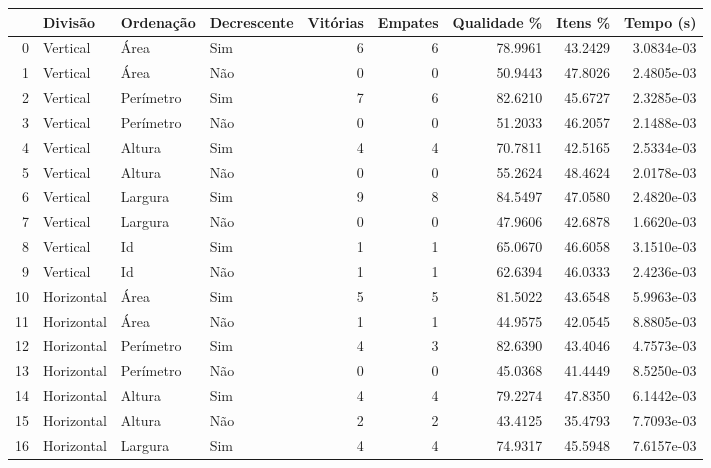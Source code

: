 \begin{tabular}{rlllrrrrr}
\hline
& Divisão     & Ordenação & Decrescente & Vitórias & Empates & Qualidade \% & Itens \% & Tempo (s)  \\
\hline
0  & Vertical    & Área      & Sim         & 6        & 6       & 78.9961      & 43.2429  & 3.0834e-03 \\
1  & Vertical    & Área      & Não         & 0        & 0       & 50.9443      & 47.8026  & 2.4805e-03 \\
2  & Vertical    & Perímetro & Sim         & 7        & 6       & 82.6210      & 45.6727  & 2.3285e-03 \\
3  & Vertical    & Perímetro & Não         & 0        & 0       & 51.2033      & 46.2057  & 2.1488e-03 \\
4  & Vertical    & Altura    & Sim         & 4        & 4       & 70.7811      & 42.5165  & 2.5334e-03 \\
5  & Vertical    & Altura    & Não         & 0        & 0       & 55.2624      & 48.4624  & 2.0178e-03 \\
6  & Vertical    & Largura   & Sim         & 9        & 8       & 84.5497      & 47.0580  & 2.4820e-03 \\
7  & Vertical    & Largura   & Não         & 0        & 0       & 47.9606      & 42.6878  & 1.6620e-03 \\
8  & Vertical    & Id        & Sim         & 1        & 1       & 65.0670      & 46.6058  & 3.1510e-03 \\
9  & Vertical    & Id        & Não         & 1        & 1       & 62.6394      & 46.0333  & 2.4236e-03 \\
10 & Horizontal  & Área      & Sim         & 5        & 5       & 81.5022      & 43.6548  & 5.9963e-03 \\
11 & Horizontal  & Área      & Não         & 1        & 1       & 44.9575      & 42.0545  & 8.8805e-03 \\
12 & Horizontal  & Perímetro & Sim         & 4        & 3       & 82.6390      & 43.4046  & 4.7573e-03 \\
13 & Horizontal  & Perímetro & Não         & 0        & 0       & 45.0368      & 41.4449  & 8.5250e-03 \\
14 & Horizontal  & Altura    & Sim         & 4        & 4       & 79.2274      & 47.8350  & 6.1442e-03 \\
15 & Horizontal  & Altura    & Não         & 2        & 2       & 43.4125      & 35.4793  & 7.7093e-03 \\
16 & Horizontal  & Largura   & Sim         & 4        & 4       & 74.9317      & 45.5948  & 7.6157e-03 \\

\end{tabular}
